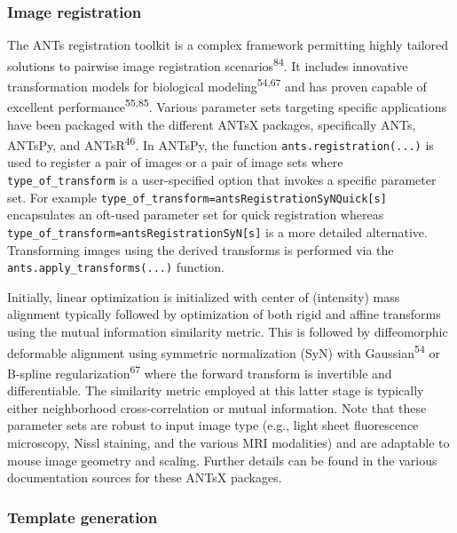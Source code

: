 \documentclass[
  12pt,
]{article}
\begin{document}
\subsubsection{Image registration}\label{image-registration}

The ANTs registration toolkit is a complex framework permitting highly
tailored solutions to pairwise image registration
scenarios\textsuperscript{84}. It includes innovative transformation
models for biological modeling\textsuperscript{54,67} and has proven
capable of excellent performance\textsuperscript{55,85}. Various
parameter sets targeting specific applications have been packaged with
the different ANTsX packages, specifically ANTs, ANTsPy, and
ANTsR\textsuperscript{46}. In ANTsPy, the function
\texttt{ants.registration(...)} is used to register a pair of images or
a pair of image sets where \texttt{type\_of\_transform} is a
user-specified option that invokes a specific parameter set. For example
\texttt{type\_of\_transform=\textquotesingle{}antsRegistrationSyNQuick{[}s{]}\textquotesingle{}}
encapsulates an oft-used parameter set for quick registration whereas
\texttt{type\_of\_transform=\textquotesingle{}antsRegistrationSyN{[}s{]}\textquotesingle{}}
is a more detailed alternative. Transforming images using the derived
transforms is performed via the \texttt{ants.apply\_transforms(...)}
function.

Initially, linear optimization is initialized with center of (intensity)
mass alignment typically followed by optimization of both rigid and
affine transforms using the mutual information similarity metric. This
is followed by diffeomorphic deformable alignment using symmetric
normalization (SyN) with Gaussian\textsuperscript{54} or B-spline
regularization\textsuperscript{67} where the forward transform is
invertible and differentiable. The similarity metric employed at this
latter stage is typically either neighborhood cross-correlation or
mutual information. Note that these parameter sets are robust to input
image type (e.g., light sheet fluorescence microscopy, Nissl staining,
and the various MRI modalities) and are adaptable to mouse image
geometry and scaling. Further details can be found in the various
documentation sources for these ANTsX packages.

\subsubsection{Template generation}\label{template-generation}
\end{document}

